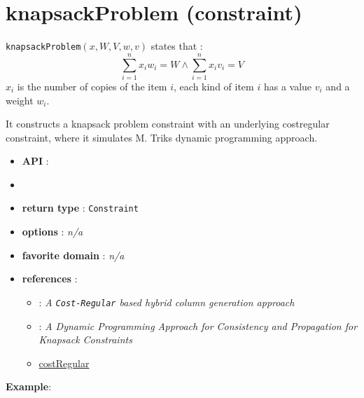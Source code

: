 \section{knapsackProblem (constraint)}\label{knapsackproblem:knapsackproblemconstraint}\hypertarget{knapsackproblem:knapsackproblemconstraint}{}
\begin{notedef}
  \texttt{knapsackProblem}$(x, W, V, w, v)$ states that :
$$\sum_{i=1}^{n}x_{i}w_{i}=W \wedge \sum_{i=1}^{n}x_{i}v_{i}=V$$
$x_i$ is the number of copies of the item $i$, each kind of item $i$ has a value $v_i$ and a weight $w_i$.
\end{notedef}
It constructs a knapsack problem constraint with an underlying costregular constraint, where it simulates M. Triks dynamic programming approach.

\begin{itemize}
	\item \textbf{API} :\item {}
	\item \textbf{return type} : \texttt{Constraint}
	\item \textbf{options} : \emph{n/a}
	\item \textbf{favorite domain} : \emph{n/a}
	\item \textbf{references} : 
	\begin{itemize}
		\item \cite{DemasseyC06}: \emph{A \texttt{Cost-Regular} based hybrid column generation approach}
		\item \cite{TrickAOR03}: \emph{A Dynamic Programming Approach for Consistency and Propagation for Knapsack Constraints}
		\item \hyperlink{costregular:costregularconstraint}{costRegular}
	\end{itemize}
\end{itemize}

\textbf{Example}:


